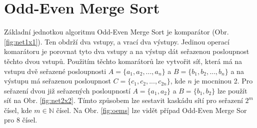 \documentclass[12pt,a4paper]{article}
\begin{document}

\section{Odd-Even Merge Sort}
\label{sec:odd_even_merge_sort}
Základní jednotkou algoritmu Odd-Even Merge Sort je komparátor (Obr. \ref{fig:net1x1}). 
Ten obdrží dva vstupy, a vrací dva výstupy. Jedinou operací komarátoru je porovnat tyto dva vstupy a na výstup dát seřazenou posloupnost těchto dvou vstupů.
Použitím těchto komarátorů lze vytvořit síť, která má na vstupu dvě seřazené posloupnosti $A = \{a_1, a_2, ..., a_n\}$ a $B = \{b_1, b_2, ..., b_n\}$ a na výstupu má seřazenou posloupnost $C = \{c_1, c_2, ..., c_{2n}\}$, kde $n$ je mocninou 2. 
Pro seřazení dvou již seřazených posloupností $A = \{a_1, a_2\}$ a $B = \{b_1, b_2\}$ lze použít síť na Obr. \ref{fig:net2x2}. 
Tímto způsobem lze sestavit kaskádu sítí pro seřazení $2^m$ čísel, kde $m \in \mathbb{N}$ čísel. 
Na Obr. \ref{fig:oems} lze vidět případ Odd-Even Merge Sor pro 8 čísel.
\end{document}
